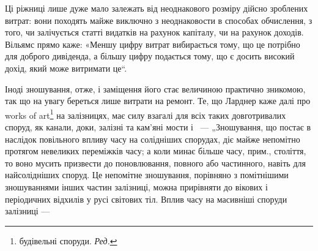 \noindent{}Ці ріжниці лише дуже мало залежать від неоднакового розміру дійсно зроблених витрат: вони походять
майже виключно з неоднаковости в способах обчислення, з того, чи залічується статті видатків на
рахунок капіталу, чи на рахунок доходів. Вільямс прямо каже: «Меншу цифру витрат вибирається тому,
що це потрібно для доброго дивіденда, а більшу цифру подається тому, що є досить високий дохід, який
може витримати це“.

Іноді зношування, отже, і заміщення його стає величиною практично зникомою, так що на увагу береться
лише витрати на ремонт. Те, що Ларднер каже далі про works of art\footnote*{
будівельні споруди. \emph{Ред.}
} на залізницях, має силу взагалі
для всіх таких довготривалих споруд, як канали, доки, залізні та кам’яні мости і~ —
„Зношування, що постає в наслідок повільного впливу часу на солідніших спорудах, діє майже непомітно
протягом невеликих переміжків часу; а коли минає більше часу, прим., століття, то воно мусить
призвести до поновлювання, повного або частинного, навіть для найсолідніших споруд. Це непомітне
зношування, порівняно з помітнішими зношуваннями інших частин залізниці, можна прирівняти до вікових
і періодичних відхилів у русі світових тіл. Вплив часу на масивніші споруди залізниці —
\parbreak{}  %
